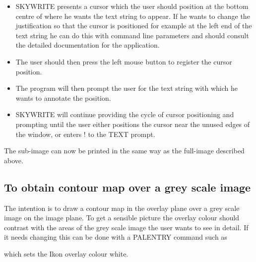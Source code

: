 \documentclass[twoside,11pt]{starlink}
\begin{document}
\begin{itemize}
\item SKYWRITE presents a cursor which the user should position at the bottom
centre of where he wants the text string to appear. If he wants to change the
justification so that the cursor is positioned for example at the left end of
the text string he can do this with command line parameters and should consult
the detailed documentation for the application.
\item The user should then press the left mouse button to register the cursor
position.
\item The program will then prompt the user for the text string with which he
wants to annotate the position.
\item SKYWRITE will continue providing the cycle of cursor positioning and
prompting until the user either positions the cursor near the unused edges of
the window, or enters ! to the TEXT prompt.
\end{itemize}

The sub-image can now be printed in the same way as the full-image described
above.
\subsection{To obtain contour map over a grey scale image}
\label{k:contgrey}
The intention is to draw a contour map in the overlay plane over a grey scale
image on the image plane. To get a sensible picture the overlay colour should
contrast with the areas of the grey scale image the user wants to see in detail.
If it needs changing this can be done with a PALENTRY command such as
\begin{small}
\end{small}
which sets the Ikon overlay colour white.
\end{document}
